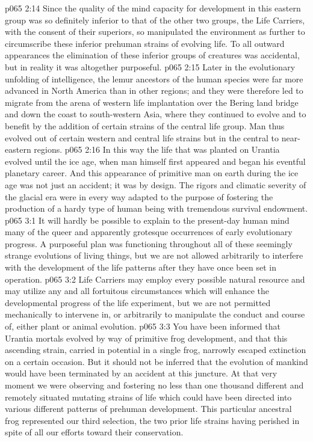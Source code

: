 \vs p065 2:14 Since the quality of the mind capacity for development in this eastern group was so definitely inferior to that of the other two groups, the Life Carriers, with the consent of their superiors, so manipulated the environment as further to circumscribe these inferior prehuman strains of evolving life. To all outward appearances the elimination of these inferior groups of creatures was accidental, but in reality it was altogether purposeful.
\vs p065 2:15 Later in the evolutionary unfolding of intelligence, the lemur ancestors of the human species were far more advanced in North America than in other regions; and they were therefore led to migrate from the arena of western life implantation over the Bering land bridge and down the coast to south\hyp{}western Asia, where they continued to evolve and to benefit by the addition of certain strains of the central life group. Man thus evolved out of certain western and central life strains but in the central to near\hyp{}eastern regions.
\vs p065 2:16 In this way the life that was planted on Urantia evolved until the ice age, when man himself first appeared and began his eventful planetary career. And this appearance of primitive man on earth during the ice age was not just an accident; it was by design. The rigors and climatic severity of the glacial era were in every way adapted to the purpose of fostering the production of a hardy type of human being with tremendous survival endowment.
\vs p065 3:1 It will hardly be possible to explain to the present\hyp{}day human mind many of the queer and apparently grotesque occurrences of early evolutionary progress. A purposeful plan was functioning throughout all of these seemingly strange evolutions of living things, but we are not allowed arbitrarily to interfere with the development of the life patterns after they have once been set in operation.
\vs p065 3:2 \pc Life Carriers may employ every possible natural resource and may utilize any and all fortuitous circumstances which will enhance the developmental progress of the life experiment, but we are not permitted mechanically to intervene in, or arbitrarily to manipulate the conduct and course of, either plant or animal evolution.
\vs p065 3:3 You have been informed that Urantia mortals evolved by way of primitive frog development, and that this ascending strain, carried in potential in a single frog, narrowly escaped extinction on a certain occasion. But it should not be inferred that the evolution of mankind would have been terminated by an accident at this juncture. At that very moment we were observing and fostering no less than one thousand different and remotely situated mutating strains of life which could have been directed into various different patterns of prehuman development. This particular ancestral frog represented our third selection, the two prior life strains having perished in spite of all our efforts toward their conservation.
